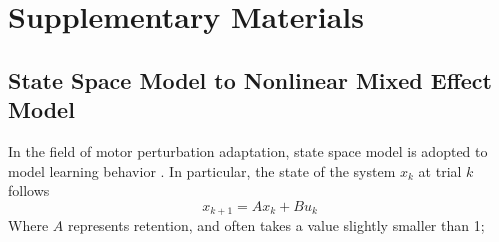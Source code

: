 \section{Supplementary Materials}
\subsection{State Space Model to Nonlinear Mixed Effect Model}\label{sec:SM1}
In the field of motor perturbation adaptation, state space model is adopted to model learning behavior \cite{Smith2006}. 
In particular, the state of the system $ x_k $ at trial $ k $ follows 
\begin{equation}\label{ssm}
x_{k+1} = Ax_k + Bu_k
\end{equation}
Where $ A $ represents retention, and often takes a value slightly smaller than 1; 
